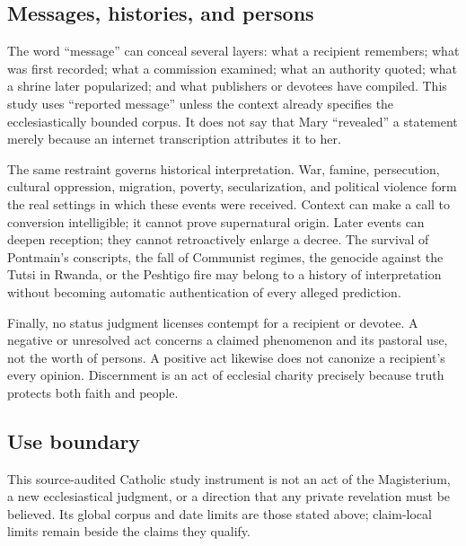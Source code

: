 {\subsection{Messages, histories, and persons}

The word ``message'' can conceal several layers: what a recipient remembers; what was first recorded; what a commission examined; what an authority quoted; what a shrine later popularized; and what publishers or devotees have compiled. This study uses ``reported message'' unless the context already specifies the ecclesiastically bounded corpus. It does not say that Mary ``revealed'' a statement merely because an internet transcription attributes it to her.

The same restraint governs historical interpretation. War, famine, persecution, cultural oppression, migration, poverty, secularization, and political violence form the real settings in which these events were received. Context can make a call to conversion intelligible; it cannot prove supernatural origin. Later events can deepen reception; they cannot retroactively enlarge a decree. The survival of Pontmain's conscripts, the fall of Communist regimes, the genocide against the Tutsi in Rwanda, or the Peshtigo fire may belong to a history of interpretation without becoming automatic authentication of every alleged prediction.

Finally, no status judgment licenses contempt for a recipient or devotee. A negative or unresolved act concerns a claimed phenomenon and its pastoral use, not the worth of persons. A positive act likewise does not canonize a recipient's every opinion. Discernment is an act of ecclesial charity precisely because truth protects both faith and people.

\subsection{Use boundary}

This source-audited Catholic study instrument is not an act of the Magisterium, a new ecclesiastical judgment, or a direction that any private revelation must be believed. Its global corpus and date limits are those stated above; claim-local limits remain beside the claims they qualify.
}
